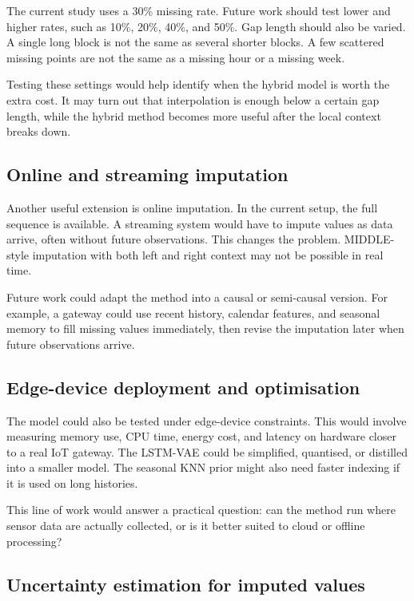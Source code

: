 The current study uses a 30\% missing rate. Future work should test lower and higher rates, such as 10\%, 20\%, 40\%, and 50\%. Gap length should also be varied. A single long block is not the same as several shorter blocks. A few scattered missing points are not the same as a missing hour or a missing week.

Testing these settings would help identify when the hybrid model is worth the extra cost. It may turn out that interpolation is enough below a certain gap length, while the hybrid method becomes more useful after the local context breaks down.

\subsection{Online and streaming imputation}

Another useful extension is online imputation. In the current setup, the full sequence is available. A streaming system would have to impute values as data arrive, often without future observations. This changes the problem. MIDDLE-style imputation with both left and right context may not be possible in real time.

Future work could adapt the method into a causal or semi-causal version. For example, a gateway could use recent history, calendar features, and seasonal memory to fill missing values immediately, then revise the imputation later when future observations arrive.

\subsection{Edge-device deployment and optimisation}

The model could also be tested under edge-device constraints. This would involve measuring memory use, CPU time, energy cost, and latency on hardware closer to a real IoT gateway. The LSTM-VAE could be simplified, quantised, or distilled into a smaller model. The seasonal KNN prior might also need faster indexing if it is used on long histories.

This line of work would answer a practical question: can the method run where sensor data are actually collected, or is it better suited to cloud or offline processing?

\subsection{Uncertainty estimation for imputed values}

